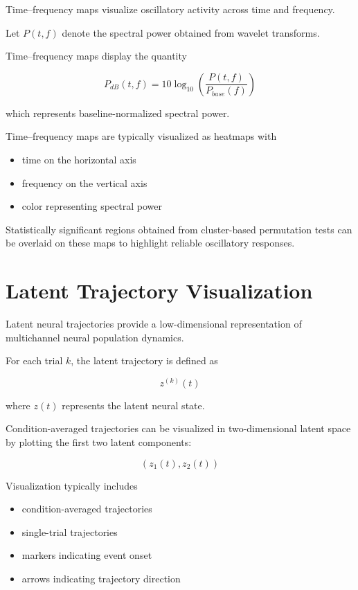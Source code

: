 \documentclass[11pt]{report}
\begin{document}
Time--frequency maps visualize oscillatory activity across time
and frequency.

Let $P(t,f)$ denote the spectral power obtained from wavelet
transforms.

Time--frequency maps display the quantity

\begin{equation}
P_{dB}(t,f) =
10\log_{10}
\left(
\frac{P(t,f)}{P_{base}(f)}
\right)
\end{equation}

which represents baseline-normalized spectral power.

Time--frequency maps are typically visualized as heatmaps with

\begin{itemize}
\item time on the horizontal axis
\item frequency on the vertical axis
\item color representing spectral power
\end{itemize}

Statistically significant regions obtained from cluster-based
permutation tests can be overlaid on these maps to highlight
reliable oscillatory responses.

\section{Latent Trajectory Visualization}

Latent neural trajectories provide a low-dimensional representation
of multichannel neural population dynamics.

For each trial $k$, the latent trajectory is defined as

\begin{equation}
z^{(k)}(t)
\end{equation}

where $z(t)$ represents the latent neural state.

Condition-averaged trajectories can be visualized in two-dimensional
latent space by plotting the first two latent components:

\begin{equation}
(z_1(t), z_2(t))
\end{equation}

Visualization typically includes

\begin{itemize}
\item condition-averaged trajectories
\item single-trial trajectories
\item markers indicating event onset
\item arrows indicating trajectory direction
\end{itemize}
\end{document}
